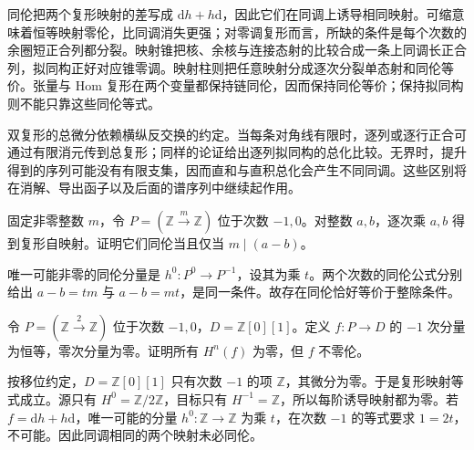 




\begin{chaptersummary}
	同伦把两个复形映射的差写成 \(\mathrm{d}h+h\mathrm{d}\)，因此它们在同调上诱导相同映射。可缩意味着恒等映射零伦，比同调消失更强；对零调复形而言，所缺的条件是每个次数的余圈短正合列都分裂。映射锥把核、余核与连接态射的比较合成一条上同调长正合列，拟同构正好对应锥零调。映射柱则把任意映射分成逐次分裂单态射和同伦等价。张量与 Hom 复形在两个变量都保持链同伦，因而保持同伦等价；保持拟同构则不能只靠这些同伦等式。

	\ProseParagraphBreak
	双复形的总微分依赖横纵反交换的约定。当每条对角线有限时，逐列或逐行正合可通过有限消元传到总复形；同样的论证给出逐列拟同构的总化比较。无界时，提升得到的序列可能没有有限支集，因而直和与直积总化会产生不同同调。这些区别将在消解、导出函子以及后面的谱序列中继续起作用。
\end{chaptersummary}

\BookExercises

\begin{exercise}\label{b4:ex:06-scalar-homotopy}
	固定非零整数 \(m\)，令 \(P=(\mathbb Z\xrightarrow{m}\mathbb Z)\) 位于次数 \(-1,0\)。对整数 \(a,b\)，逐次乘 \(a,b\) 得到复形自映射。证明它们同伦当且仅当 \(m\mid(a-b)\)。
\end{exercise}
\begin{solution}
	唯一可能非零的同伦分量是 \(h^0:P^0\to P^{-1}\)，设其为乘 \(t\)。两个次数的同伦公式分别给出 \(a-b=tm\) 与 \(a-b=mt\)，是同一条件。故存在同伦恰好等价于整除条件。
\end{solution}

\begin{exercise}\label{b4:ex:06-homology-zero-not-null}
	令 \(P=(\mathbb Z\xrightarrow{2}\mathbb Z)\) 位于次数 \(-1,0\)，\(D=\mathbb Z[0][1]\)。定义 \(f:P\to D\) 的 \(-1\) 次分量为恒等，零次分量为零。证明所有 \(H^n(f)\) 为零，但 \(f\) 不零伦。
\end{exercise}
\begin{solution}
	按移位约定，\(D=\mathbb Z[0][1]\) 只有次数 \(-1\) 的项 \(\mathbb Z\)，其微分为零。于是复形映射等式成立。源只有 \(H^0=\mathbb Z/2\mathbb Z\)，目标只有 \(H^{-1}=\mathbb Z\)，所以每阶诱导映射都为零。若 \(f=\mathrm{d}h+h\mathrm{d}\)，唯一可能的分量 \(h^0:\mathbb Z\to\mathbb Z\) 为乘 \(t\)，在次数 \(-1\) 的等式要求 \(1=2t\)，不可能。因此同调相同的两个映射未必同伦。
\end{solution}


